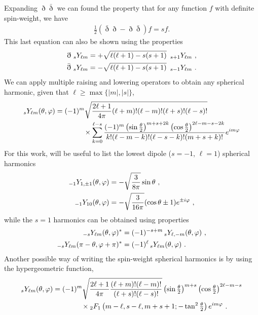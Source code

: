 Expanding $\eth \bar{\eth}$ we can found the property that for any function $f$ with definite spin-weight, we have
\begin{align}
	\frac{1}{2} (\bar\eth \eth - \eth \bar{\eth} ) f = s f .
\end{align}
This last equation can also be shown using the properties
\begin{align}
	\begin{split}
		\eth ~\uu[s]{Y}{\ell m} = +\sqrt{\ell(\ell+1)-s(s+1)} ~\,\uu[s+1]{Y}{\ell m} ~, \\
		\bar\eth ~\uu[s]{Y}{\ell m} = -\sqrt{\ell(\ell+1)-s(s+1)} ~\,\uu[s-1]{Y}{\ell m} ~.
	\end{split}
\end{align}
We can apply multiple raising and lowering operators to obtain any spherical harmonic, given that $\ell\ge \max\{ |m|, |s| \}$,
\begin{align}
	\begin{split}
	\uu[s]{Y}{\ell m}(\theta,\varphi) &= (-1)^m \sqrt{\frac{2\ell+1}{4 \pi} (\ell+m)! (\ell-m)! (\ell+s)! (\ell-s)!} \\
	&\qquad\qquad \times \sum_{k=0}^{\ell-s} \frac{(-1)^m \left(\sin\tfrac{\theta}{2} \right)^{m+s+2k} \left(\cos\tfrac{\theta}{2} \right)^{2\ell-m-s-2k}}{k!(\ell-m-k)!(\ell-s-k)!(m+s+k)!} e^{i m \varphi}
	\end{split}
\end{align}
For this work, will be useful to list the lowest dipole ($s=-1$, $\ell=1$) spherical harmonics
\begin{align}
	\begin{split}
	\uu[-1]{Y}{1,\pm 1}(\theta,\varphi) &= -\sqrt{\frac{3}{8\pi}} \sin\theta ~,\\
	\uu[-1]{Y}{10}(\theta,\varphi) &= -\sqrt{\frac{3}{16\pi}} (\cos\theta \pm 1) e^{\pm i \varphi} ~,
	\end{split}
\end{align}
while the $s=1$ harmonics can be obtained using properties
\begin{align}
	\begin{split}
		\uu[-s]{Y}{\ell m}(\theta,\varphi)^* &= (-1)^{-s+m} \,\uu[s]{Y}{\ell, -m}(\theta,\varphi) ~, \\
		\uu[-s]{Y}{\ell m}(\pi-\theta,\varphi+\pi)^* &= (-1)^{\ell} \,\uu[s]{Y}{\ell m}(\theta,\varphi) ~.
	\end{split}	
\end{align}
Another possible way of writing the spin-weight spherical harmonics is by using the hypergeometric function,
\begin{align}
	\begin{split}
	\uu[s]{Y}{\ell m}(\theta,\varphi) &= (-1)^m \sqrt{\frac{2\ell+1}{4 \pi} \frac{(\ell+m)! (\ell-m)!}{(\ell+s)! (\ell-s)!}} \left(\sin\tfrac{\theta}{2} \right)^{m+s} \left(\cos\tfrac{\theta}{2} \right)^{2\ell-m-s} \\
	&\qquad\qquad \times \uu[2]{F}{1}\left( m-\ell, s-\ell, m+s+1; - \tan^2\tfrac{\theta}{2} \right) e^{i m \varphi} ~.
	\end{split}
\end{align}

